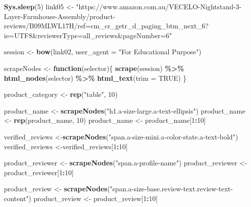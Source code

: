 \documentclass[
]{article}
\newenvironment{Shaded}{\begin{snugshade}}{\end{snugshade}}
\newcommand{\AttributeTok}[1]{\textcolor[rgb]{0.13,0.29,0.53}{#1}}
\newcommand{\ConstantTok}[1]{\textcolor[rgb]{0.56,0.35,0.01}{#1}}
\newcommand{\ControlFlowTok}[1]{\textcolor[rgb]{0.13,0.29,0.53}{\textbf{#1}}}
\newcommand{\DecValTok}[1]{\textcolor[rgb]{0.00,0.00,0.81}{#1}}
\newcommand{\FunctionTok}[1]{\textcolor[rgb]{0.13,0.29,0.53}{\textbf{#1}}}
\newcommand{\NormalTok}[1]{#1}
\newcommand{\OtherTok}[1]{\textcolor[rgb]{0.56,0.35,0.01}{#1}}
\newcommand{\SpecialCharTok}[1]{\textcolor[rgb]{0.81,0.36,0.00}{\textbf{#1}}}
\newcommand{\StringTok}[1]{\textcolor[rgb]{0.31,0.60,0.02}{#1}}
\begin{document}
\begin{Shaded}
\begin{Highlighting}[]
   \FunctionTok{Sys.sleep}\NormalTok{(}\DecValTok{5}\NormalTok{)}
\NormalTok{link05 }\OtherTok{\textless{}{-}} \StringTok{"https://www.amazon.com.au/VECELO{-}Nightstand{-}3{-}Layer{-}Farmhouse{-}Assembly/product{-}reviews/B09MLWL17H/ref=cm\_cr\_getr\_d\_paging\_btm\_next\_6?ie=UTF8\&reviewerType=all\_reviews\&pageNumber=6"}


\NormalTok{  session }\OtherTok{\textless{}{-}} \FunctionTok{bow}\NormalTok{(link02,}
               \AttributeTok{user\_agent =} \StringTok{"For Educational Purpose"}\NormalTok{)}

\NormalTok{  scrapeNodes }\OtherTok{\textless{}{-}} \ControlFlowTok{function}\NormalTok{(selector)\{}
    \FunctionTok{scrape}\NormalTok{(session) }\SpecialCharTok{\%\textgreater{}\%}
      \FunctionTok{html\_nodes}\NormalTok{(selector) }\SpecialCharTok{\%\textgreater{}\%}
      \FunctionTok{html\_text}\NormalTok{(}\AttributeTok{trim =} \ConstantTok{TRUE}\NormalTok{)}
\NormalTok{  \}}

\NormalTok{  product\_category }\OtherTok{\textless{}{-}} \FunctionTok{rep}\NormalTok{(}\StringTok{"table"}\NormalTok{, }\DecValTok{10}\NormalTok{)}

\NormalTok{  product\_name }\OtherTok{\textless{}{-}} \FunctionTok{scrapeNodes}\NormalTok{(}\StringTok{"h1.a{-}size{-}large.a{-}text{-}ellipsis"}\NormalTok{)}
\NormalTok{  product\_name }\OtherTok{\textless{}{-}} \FunctionTok{rep}\NormalTok{(product\_name, }\DecValTok{10}\NormalTok{)}
\NormalTok{  product\_name }\OtherTok{\textless{}{-}}\NormalTok{ product\_name[}\DecValTok{1}\SpecialCharTok{:}\DecValTok{10}\NormalTok{]}
  
\NormalTok{  verified\_reviews }\OtherTok{\textless{}{-}}\FunctionTok{scrapeNodes}\NormalTok{(}\StringTok{"span.a{-}size{-}mini.a{-}color{-}state.a{-}text{-}bold"}\NormalTok{)}
\NormalTok{  verified\_reviews }\OtherTok{\textless{}{-}}\NormalTok{verified\_reviews[}\DecValTok{1}\SpecialCharTok{:}\DecValTok{10}\NormalTok{]}
  
\NormalTok{  product\_reviewer }\OtherTok{\textless{}{-}} \FunctionTok{scrapeNodes}\NormalTok{(}\StringTok{"span.a{-}profile{-}name"}\NormalTok{)}
\NormalTok{  product\_reviewer }\OtherTok{\textless{}{-}}\NormalTok{ product\_reviewer[}\DecValTok{1}\SpecialCharTok{:}\DecValTok{10}\NormalTok{]}
  
\NormalTok{  product\_review }\OtherTok{\textless{}{-}} \FunctionTok{scrapeNodes}\NormalTok{(}\StringTok{"span.a{-}size{-}base.review{-}text.review{-}text{-}content"}\NormalTok{)}
\NormalTok{  product\_review }\OtherTok{\textless{}{-}}\NormalTok{ product\_review[}\DecValTok{1}\SpecialCharTok{:}\DecValTok{10}\NormalTok{]}
  

\end{Highlighting}
\end{Shaded}
\end{document}
